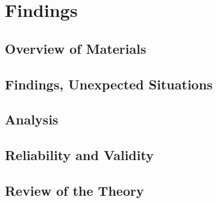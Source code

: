 \chapter{Findings}

\section{Overview of Materials}

\section{Findings, Unexpected Situations}

\section{Analysis}

\section{Reliability and Validity}

\section{Review of the Theory}